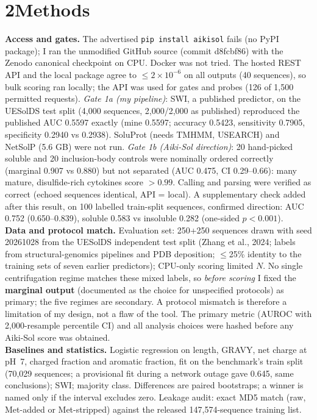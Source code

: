 \documentclass[10pt]{article}
\begin{document}
\section*{2\quad Methods}
\textbf{Access and gates.} The advertised \texttt{pip install aikisol} fails (no PyPI package); I ran the unmodified GitHub source (commit d8fcbf86) with the Zenodo canonical checkpoint on CPU. Docker was not tried. The hosted REST API and the local package agree to $\le 2\times10^{-6}$ on all outputs (40 sequences), so bulk scoring ran locally; the API was used for gates and probes (126 of 1,500 permitted requests). \emph{Gate 1a (my pipeline)}: SWI, a published predictor, on the UESolDS test split (4,000 sequences, 2,000/2,000 as published) reproduced the published AUC 0.5597 exactly (mine 0.5597; accuracy 0.5423, sensitivity 0.7905, specificity 0.2940 vs 0.2938). SoluProt (needs TMHMM, USEARCH) and NetSolP (5.6 GB) were not run. \emph{Gate 1b (Aiki-Sol direction)}: 20 hand-picked soluble and 20 inclusion-body controls were nominally ordered correctly (marginal 0.907 vs 0.880) but not separated (AUC 0.475, CI 0.29--0.66): many mature, disulfide-rich cytokines score $>0.99$. Calling and parsing were verified as correct (echoed sequences identical, API = local). A supplementary check added after this result, on 100 labelled train-split sequences, confirmed direction: AUC 0.752 (0.650--0.839), soluble 0.583 vs insoluble 0.282 (one-sided $p<0.001$).\\
\textbf{Data and protocol match.} Evaluation set: 250+250 sequences drawn with seed 20261028 from the UESolDS independent test split (Zhang et al., 2024; labels from structural-genomics pipelines and PDB deposition; $\le$25\% identity to the training sets of seven earlier predictors); CPU-only scoring limited $N$. No single centrifugation regime matches these mixed labels, so \emph{before scoring} I fixed the \textbf{marginal output} (documented as the choice for unspecified protocols) as primary; the five regimes are secondary. A protocol mismatch is therefore a limitation of my design, not a flaw of the tool. The primary metric (AUROC with 2,000-resample percentile CI) and all analysis choices were hashed before any Aiki-Sol score was obtained.\\
\textbf{Baselines and statistics.} Logistic regression on length, GRAVY, net charge at pH~7, charged fraction and aromatic fraction, fit on the benchmark's train split (70,029 sequences; a provisional fit during a network outage gave 0.645, same conclusions); SWI; majority class. Differences are paired bootstraps; a winner is named only if the interval excludes zero. Leakage audit: exact MD5 match (raw, Met-added or Met-stripped) against the released 147,574-sequence training list.
\end{document}
